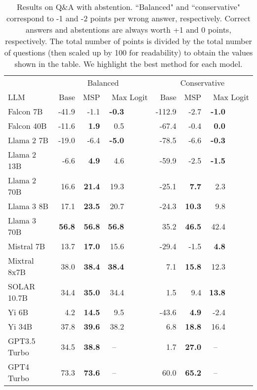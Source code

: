 \begin{table}[tb]
\small
\centering
\newcommand\offset{~~~~~~}
\caption{Results on Q\&A with abstention. ``Balanced" and ``conservative" correspond to -1 and -2 points per wrong answer, respectively. Correct answers and abstentions are always worth +1 and 0 points, respectively. The total number of points is divided by the total number of questions (then scaled up by 100 for readability) to obtain the values shown in the table. We highlight the best method for each model.}
\label{tab:score}
\begin{tabular}{lrrrrrr}
\toprule
& \multicolumn{3}{c}{Balanced} & \multicolumn{3}{c}{Conservative} \\ 
LLM & Base & MSP & Max Logit & Base & MSP & Max Logit \\ 
\cmidrule(lr){1-1}\cmidrule(lr){2-4}\cmidrule(lr){5-7}
Falcon 7B & -41.9 & -1.1 & \textbf{-0.3}\offset & -112.9 & -2.7 & \textbf{-1.0}\offset\\
Falcon 40B & -11.6 & \textbf{1.9} & 0.5\offset & -67.4 & -0.4 & \textbf{0.0}\offset\\
Llama 2 7B & -19.0 & -6.4 & \textbf{-5.0}\offset & -78.5 & -6.6 & \textbf{-0.3}\offset\\
Llama 2 13B & -6.6 & \textbf{4.9} & 4.6\offset & -59.9 & -2.5 & \textbf{-1.5}\offset\\
Llama 2 70B & 16.6 & \textbf{21.4} & 19.3\offset & -25.1 & \textbf{7.7} & 2.3\offset\\
Llama 3 8B & 17.1 & \textbf{23.5} & 20.7\offset & -24.3 & \textbf{10.3} & 9.8\offset\\
Llama 3 70B & \textbf{56.8} & \textbf{56.8} & \textbf{56.8}\offset & 35.2 & \textbf{46.5} & 42.4\offset\\
Mistral 7B & 13.7 & \textbf{17.0} & 15.6\offset & -29.4 & -1.5 & \textbf{4.8}\offset\\
Mixtral 8x7B & 38.0 & \textbf{38.4} & \textbf{38.4}\offset & 7.1 & \textbf{15.8} & 12.3\offset\\
SOLAR 10.7B & 34.4 & \textbf{35.0} & 34.4\offset & 1.5 & 9.4 & \textbf{13.8}\offset\\
Yi 6B & 4.2 & \textbf{14.5} & 9.5\offset & -43.6 & \textbf{4.9} & -2.4\offset\\
Yi 34B & 37.8 & \textbf{39.6} & 38.2\offset & 6.8 & \textbf{18.8} & 16.4\offset\\
GPT3.5 Turbo & 34.5 & \textbf{38.8} & --~~\offset & 1.7 & \textbf{27.0} & --~~\offset\\
GPT4 Turbo & 73.3 & \textbf{73.6} & --~~\offset & 60.0 & \textbf{65.2} & --~~\offset \\
\bottomrule
\end{tabular}
\end{table}
